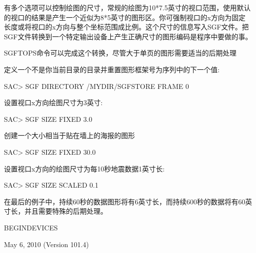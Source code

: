 有多个选项可以控制绘图的尺寸，常规的绘图为10*7.5英寸的视口范围，使用默认的视口的结果是产生一个近似为8*5英寸的图形区。你可强制视口的x方向为固定长度或将视口的x方向与整个坐标范围成比例。这个尺寸的信息写入SGF文件。把SGF文件转换到一个特定输出设备上产生正确尺寸的图形编码是程序中要做的事。

SGFTOPS命令可以完成这个转换，尽管大于单页的图形需要适当的后期处理 

定义一个不是你当前目录的目录并重置图形框架号为序列中的下一个值:
\begin{SACCode}
SAC> SGF DIRECTORY /MYDIR/SGFSTORE FRAME 0
\end{SACCode}

设置视口x方向绘图尺寸为3英寸:
\begin{SACCode}
SAC> SGF SIZE FIXED 3.0
\end{SACCode}

创建一个大小相当于贴在墙上的海报的图形
\begin{SACCode}
SAC> SGF SIZE FIXED 30.0
\end{SACCode}

设置视口x方向的绘图尺寸为每10秒地震数据1英寸长:
\begin{SACCode}
SAC> SGF SIZE SCALED 0.1
\end{SACCode}
在最后的例子中，持续60秒的数据图形将有6英寸长，而持续600秒的数据将有60英寸长，并且需要特殊的后期处理。

BEGINDEVICES

May 6, 2010 (Version 101.4)
